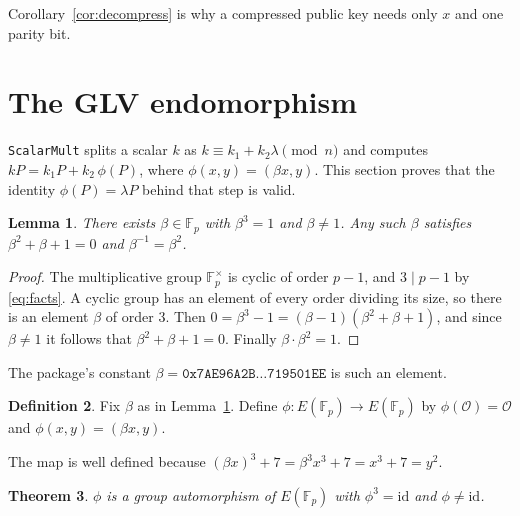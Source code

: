 \documentclass[11pt]{article}
\newtheorem{theorem}{Theorem}
\newtheorem{lemma}[theorem]{Lemma}
\theoremstyle{definition}
\newtheorem{definition}[theorem]{Definition}
\theoremstyle{remark}
\newcommand{\F}{\mathbb{F}}
\newcommand{\Oinf}{\mathcal{O}}
\begin{document}
Corollary~\ref{cor:decompress} is why a compressed public key needs only $x$
and one parity bit.

\section{The GLV endomorphism}

\texttt{ScalarMult} splits a scalar $k$ as $k \equiv k_1 + k_2\lambda \pmod n$
and computes $kP = k_1P + k_2\,\phi(P)$, where $\phi(x,y)=(\beta x, y)$. This
section proves that the identity $\phi(P)=\lambda P$ behind that step is valid.

\begin{lemma}\label{lem:beta}
There exists $\beta\in\F_p$ with $\beta^3=1$ and $\beta\neq1$. Any such $\beta$
satisfies $\beta^2+\beta+1=0$ and $\beta^{-1}=\beta^2$.
\end{lemma}

\begin{proof}
The multiplicative group $\F_p^\times$ is cyclic of order $p-1$, and
$3\mid p-1$ by \eqref{eq:facts}. A cyclic group has an element of every order
dividing its size, so there is an element $\beta$ of order $3$. Then
$0=\beta^3-1=(\beta-1)(\beta^2+\beta+1)$, and since $\beta\ne1$ it follows that
$\beta^2+\beta+1=0$. Finally $\beta\cdot\beta^2=1$.
\end{proof}

The package's constant
$\beta=\texttt{0x7AE96A2B\ldots719501EE}$ is such an element.

\begin{definition}
Fix $\beta$ as in Lemma~\ref{lem:beta}. Define $\phi:E(\F_p)\to E(\F_p)$ by
$\phi(\Oinf)=\Oinf$ and $\phi(x,y) = (\beta x, y)$.
\end{definition}

The map is well defined because $(\beta x)^3+7=\beta^3x^3+7=x^3+7=y^2$.

\begin{theorem}\label{thm:endo}
$\phi$ is a group automorphism of $E(\F_p)$ with $\phi^3=\mathrm{id}$ and
$\phi\ne\mathrm{id}$.
\end{theorem}
\end{document}
